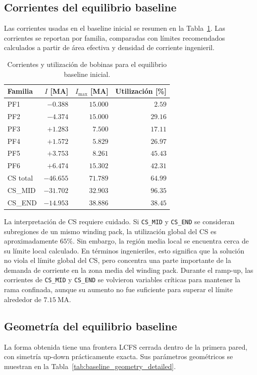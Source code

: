 \documentclass[11pt,a4paper]{article}
\begin{document}
\subsection{Corrientes del equilibrio baseline}
Las corrientes usadas en el baseline inicial se resumen en la Tabla~\ref{tab:baseline_currents}. Las
corrientes se reportan por familia, comparadas con límites recomendados calculados a partir
de área efectiva y densidad de corriente ingenieril.

\begin{table}[htbp]
\centering
\caption{Corrientes y utilización de bobinas para el equilibrio baseline inicial.}
\label{tab:baseline_currents}
\begin{tabular}{lrrr}
\toprule
\textbf{Familia} & \textbf{$I$ [MA]} & \textbf{$I_{\max}$ [MA]} & \textbf{Utilización [\%]} \\
\midrule
PF1 & $-0.388$ & $15.000$ & $2.59$ \\
PF2 & $-4.374$ & $15.000$ & $29.16$ \\
PF3 & $+1.283$ & $7.500$ & $17.11$ \\
PF4 & $+1.572$ & $5.829$ & $26.97$ \\
PF5 & $+3.753$ & $8.261$ & $45.43$ \\
PF6 & $+6.474$ & $15.302$ & $42.31$ \\
CS total & $-46.655$ & $71.789$ & $64.99$ \\
CS\_MID & $-31.702$ & $32.903$ & $96.35$ \\
CS\_END & $-14.953$ & $38.886$ & $38.45$ \\
\bottomrule
\end{tabular}
\end{table}

La interpretación de CS requiere cuidado. Si \texttt{CS\_MID} y \texttt{CS\_END} se consideran
subregiones de un mismo winding pack, la utilización global del CS es aproximadamente $65\%$.
Sin embargo, la región media local se encuentra cerca de su límite local calculado. En términos
ingenieriles, esto significa que la solución no viola el límite global del CS, pero concentra una
parte importante de la demanda de corriente en la zona media del winding pack. Durante el
ramp-up, las corrientes de \texttt{CS\_MID} y \texttt{CS\_END} se volvieron variables críticas para
mantener la rama confinada, aunque su aumento no fue suficiente para superar el límite alrededor
de $7.15~\mathrm{MA}$.

\subsection{Geometría del equilibrio baseline}
La forma obtenida tiene una frontera LCFS cerrada dentro de la primera pared, con simetría
up-down prácticamente exacta. Sus parámetros geométricos se muestran en la Tabla~\ref{tab:baseline_geometry_detailed}.
\end{document}

